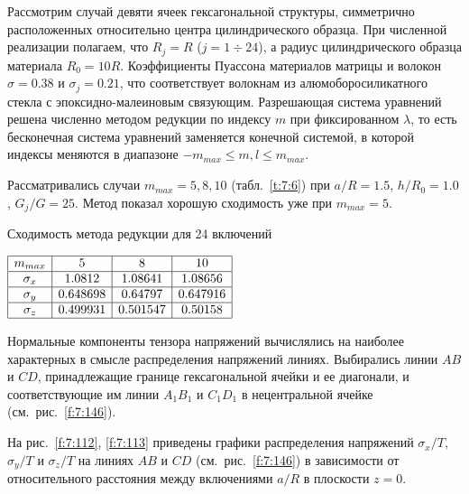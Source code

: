 Рассмотрим случай девяти ячеек гексагональной структуры, симметрично расположенных относительно центра цилиндрического образца. При численной реализации полагаем, что $R_j=R$ ($j=1\div 24$), а радиус цилиндрического образца материала $R_0=10R$. Коэффициенты Пуассона материалов матрицы и волокон $\sigma=0.38$ и $\sigma_j=0.21$, что соответствует волокнам из алюмоборосиликатного стекла с эпоксидно-малеиновым связующим. Разрешающая система уравнений решена численно методом редукции по индексу $m$ при фиксированном $\lambda$, то есть бесконечная система уравнений заменяется конечной системой, в которой индексы меняются в диапазоне $-m_{max}\le m,l\le m_{max}$.


Рассматривались случаи $m_{max}=5,8,10$ (табл.~\ref{t:7:6}) при $a/R=1.5$, $h/R_0=1.0$, $G_j/G=25$. Метод показал хорошую сходимость уже при $m_{max}=5$.

\begin{table}[h!]
\caption{Сходимость метода редукции для 24 включений}
\centering
$
\begin{array}{|c|c|c|c|}
\hline
m_{max} & 5 & 8 & 10 \\
\hline
\sigma_x & 1.0812 & 1.08641 & 1.08656 \\
\hline
\sigma_y & 0.648698 & 0.64797 & 0.647916 \\
\hline
\sigma_z & 0.499931 & 0.501547 & 0.50158 \\
\hline
\end{array}
$
\label{t:7:6}
\end{table}

Нормальные компоненты тензора напряжений вычислялись на наиболее характерных в смысле распределения напряжений линиях. Выбирались линии $AB$ и $CD$, принадлежащие границе гексагональной ячейки и ее диагонали, и соответствующие им линии $A_1B_1$ и $C_1D_1$ в нецентральной ячейке (см.~рис.~\ref{f:7:146}).

На рис.~\ref{f:7:112}, \ref{f:7:113} приведены графики распределения напряжений $\sigma_x/T$, $\sigma_y/T$ и $\sigma_z/T$ на линиях $AB$ и $CD$ (см.~рис.~\ref{f:7:146}) в зависимости от относительного расстояния между включениями $a/R$ в плоскости $z=0$.

